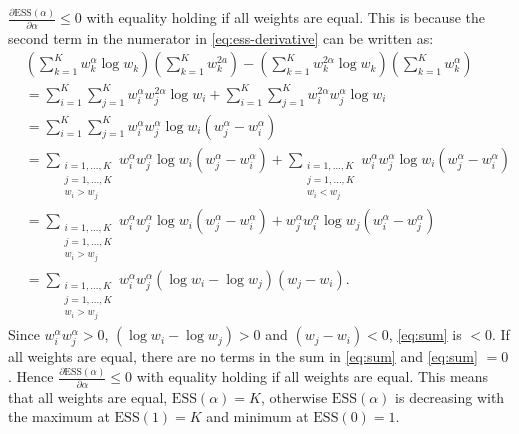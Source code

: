 \documentclass[a4paper]{article}
\DeclareMathOperator{\1}{{}\mathds{1}}
\begin{document}
$\frac{\partial \mathrm{ESS}(\alpha)}{\partial \alpha} \leq 0$ with equality holding if all weights are equal. 
This is because the second term in the numerator in \eqref{eq:ess-derivative} can be written as:
\begin{align}
    &\left(\sum_{k = 1}^K w_k^\alpha \log w_k \right) \left(\sum_{k = 1}^K w_k^{2a   } \right) - \left(\sum_{k = 1}^K w_k^{2 \alpha} \log w_k\right) \left(\sum_{k = 1}^K w_k^\alpha \right) \nonumber
    \\&= \sum_{i = 1}^K \sum_{j = 1}^K w_i^\alpha w_j^{2 \alpha} \log w_i + \sum_{i = 1}^K \sum_{j = 1}^K w_i^{2 \alpha} w_j^\alpha \log w_i \\
    &= \sum_{i = 1}^K \sum_{j = 1}^K w_i^\alpha w_j^\alpha \log w_i (w_j^\alpha - w_i^\alpha) \\
    &= \sum_{\substack{i = 1, \dotsc, K \\ j = 1, \dotsc, K \\ w_i > w_j}} w_i^\alpha w_j^\alpha \log w_i (w_j^\alpha - w_i^\alpha) + \sum_{\substack{i = 1, \dotsc, K \\ j = 1, \dotsc, K \\ w_i < w_j}} w_i^\alpha w_j^\alpha \log w_i (w_j^\alpha - w_i^\alpha) \\
    &= \sum_{\substack{i = 1, \dotsc, K \\ j = 1, \dotsc, K \\ w_i > w_j}} w_i^\alpha w_j^\alpha \log w_i (w_j^\alpha - w_i^\alpha) + w_j^\alpha w_i^\alpha \log w_j (w_i^\alpha - w_j^\alpha) \\
    &= \sum_{\substack{i = 1, \dotsc, K \\ j = 1, \dotsc, K \\ w_i > w_j}} w_i^\alpha w_j^\alpha (\log w_i - \log w_j) (w_j - w_i). \label{eq:sum}
\end{align}
Since $w_i^\alpha w_j^\alpha > 0$, $(\log w_i - \log w_j) > 0$ and $(w_j - w_i) < 0$, \eqref{eq:sum} is $< 0$.
If all weights are equal, there are no terms in the sum in \eqref{eq:sum} and \eqref{eq:sum} $= 0$.
Hence $\frac{\partial \mathrm{ESS}(\alpha)}{\partial \alpha} \leq 0$ with equality holding if all weights are equal.
This means that all weights are equal, $\mathrm{ESS}(\alpha) = K$, otherwise $\mathrm{ESS}(\alpha)$ is decreasing with the maximum at $\mathrm{ESS}(1) = K$ and minimum at $\mathrm{ESS}(0) = 1$.
\end{document}
